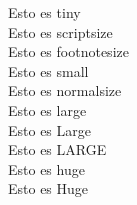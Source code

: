 \documentclass[letterpaper,12pt]{article}
\begin{document}
 \pagestyle{empty}
 \thispagestyle{empty}
 \noindent
        \tiny{Esto es tiny} \\[15pt]
	\scriptsize{Esto es scriptsize} \\[15pt]
	\footnotesize{Esto es footnotesize} \\[15pt]
	\small{Esto es small} \\[15pt]
	\normalsize{Esto es normalsize} \\[15pt]
	\large{Esto es large} \\[15pt]
	\Large{Esto es Large} \\[15pt]
	\LARGE{Esto es LARGE} \\[15pt]
        \huge{Esto es huge} \\[15pt]
	\Huge{Esto es Huge}
\end{document}
